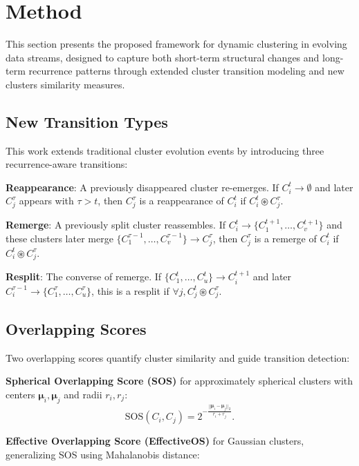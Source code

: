 \section{Method}\label{sec:method}

This section presents the proposed framework for dynamic clustering in evolving
data streams, designed to capture both short-term structural changes and
long-term recurrence patterns through extended cluster transition modeling and
new clusters similarity measures.

\subsection{New Transition Types}\label{subsec:new_transitions}

This work extends traditional cluster evolution events by introducing three
recurrence-aware transitions:

\textbf{Reappearance}: A previously disappeared cluster re-emerges. If $C_i^t \rightarrow \emptyset$ and later $C_j^\tau$ appears with $\tau > t$, then $C_j^\tau$ is a reappearance of $C_i^t$ if $C_i^t \circledast C_j^\tau$.

\textbf{Remerge}: A previously split cluster reassembles. If $C_i^t \rightarrow \{C_1^{t+1}, \dots, C_v^{t+1}\}$ and these clusters later merge $\{C_1^{\tau - 1}, \dots, C_v^{\tau - 1}\} \rightarrow C_j^{\tau}$, then $C_j^{\tau}$ is a remerge of $C_i^t$ if $C_i^t \circledast C_j^{\tau}$.

\textbf{Resplit}: The converse of remerge. If $\{C_1^t, \dots, C_u^t\} \rightarrow C_i^{t+1}$ and later $C_i^{\tau - 1} \rightarrow \{C_1^{\tau}, \dots, C_u^{\tau}\}$, this is a resplit if $\forall j, C_j^t \circledast C_j^{\tau}$.

\subsection{Overlapping Scores}\label{overlapping_scores}

Two overlapping scores quantify cluster similarity and guide transition
detection:

\textbf{Spherical Overlapping Score (SOS)} for approximately spherical clusters with centers $\boldsymbol{\mu}_i, \boldsymbol{\mu}_j$ and radii $r_i, r_j$:
\[
    \text{SOS}(C_i, C_j) = 2^{- \frac{||\boldsymbol{\mu}_i - \boldsymbol{\mu}_j||_2}{r_i + r_j}}.
\]

\textbf{Effective Overlapping Score (EffectiveOS)} for Gaussian clusters, generalizing \textsc{SOS} using Mahalanobis distance:

